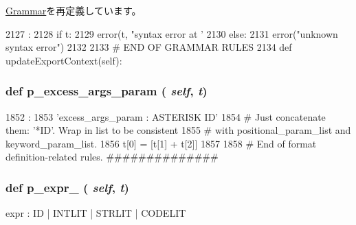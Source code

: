 \hyperlink{classm5_1_1util_1_1grammar_1_1Grammar_ae0bf47d4531770b27bea904d5ed183f6}{Grammar}を再定義しています。


\begin{DoxyCode}
2127                         :
2128         if t:
2129             error(t, "syntax error at '%
2130         else:
2131             error("unknown syntax error")
2132 
2133     # END OF GRAMMAR RULES
2134 
    def updateExportContext(self):
\end{DoxyCode}
\hypertarget{classisa__parser_1_1ISAParser_a16601844da02de1278037959597f5278}{
\subsubsection[{p\_\-excess\_\-args\_\-param}]{\setlength{\rightskip}{0pt plus 5cm}def p\_\-excess\_\-args\_\-param ( {\em self}, \/   {\em t})}}
\label{classisa__parser_1_1ISAParser_a16601844da02de1278037959597f5278}



\begin{DoxyCode}
1852                                     :
1853         'excess_args_param : ASTERISK ID'
1854         # Just concatenate them: '*ID'.  Wrap in list to be consistent
1855         # with positional_param_list and keyword_param_list.
1856         t[0] = [t[1] + t[2]]
1857 
1858     # End of format definition-related rules.
    ##############
\end{DoxyCode}
\hypertarget{classisa__parser_1_1ISAParser_a5e7656279967abf20894ac1953923046}{
\subsubsection[{p\_\-expr\_\-0}]{\setlength{\rightskip}{0pt plus 5cm}def p\_\-expr\_ ( {\em self}, \/   {\em t})}}
\label{classisa__parser_1_1ISAParser_a5e7656279967abf20894ac1953923046}
\begin{DoxyVerb}expr : ID
| INTLIT
| STRLIT
| CODELIT\end{DoxyVerb}
 


